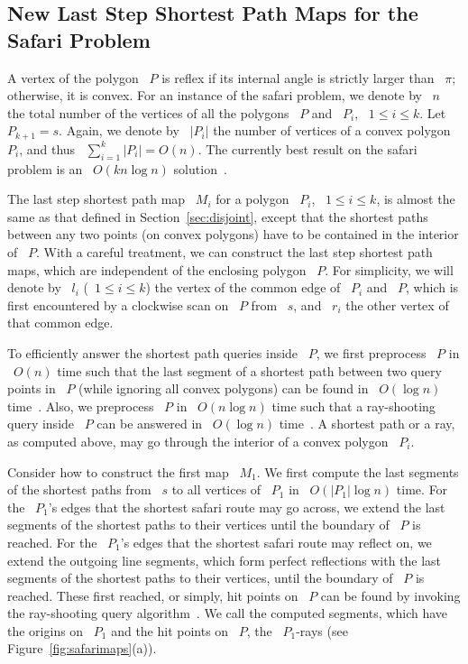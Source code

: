 \documentclass[11pt]{article}
\begin{document}
\subsection{New Last Step Shortest Path Maps for the Safari Problem}

A vertex of the polygon ~\(P\) is reflex if its internal angle is strictly larger than ~\(\pi\); otherwise, it is convex.
For an instance of the safari problem, we denote by ~\(n\) the total number of the vertices of all the polygons ~\(P\) and ~\(P_i\), ~\(1 \le i \le k\).
Let ~\(P_{k+1} = s\).
Again, we denote by ~\(|P_i|\) the number of vertices of a convex polygon ~\(P_i\), and thus ~\(\sum_{i=1}^k |P_i| = O(n)\).
The currently best result on the safari problem is an ~\(O(kn\log n)\) solution~\cite{ref6}.

The last step shortest path map ~\(M_i\) for a polygon ~\(P_i\), ~\(1 \le i \le k\), is almost the same as that defined in Section~\ref{sec:disjoint}, except that the shortest paths between any two points (on convex polygons) have to be contained in the interior of ~\(P\).
With a careful treatment, we can construct the last step shortest path maps, which are independent of the enclosing polygon ~\(P\).
For simplicity, we will denote by ~\(l_i\) (~\(1 \le i \le k\)) the vertex of the common edge of ~\(P_i\) and ~\(P\), which is first encountered by a clockwise scan on ~\(P\) from ~\(s\), and ~\(r_i\) the other vertex of that common edge.

To efficiently answer the shortest path queries inside ~\(P\), we first preprocess ~\(P\) in ~\(O(n)\) time such that the last segment of a shortest path between two query points in ~\(P\) (while ignoring all convex polygons) can be found in ~\(O(\log n)\) time~\cite{ref7}.
Also, we preprocess ~\(P\) in ~\(O(n\log n)\) time such that a ray-shooting query inside ~\(P\) can be answered in ~\(O(\log n)\) time~\cite{ref3}.
A shortest path or a ray, as computed above, may go through the interior of a convex polygon ~\(P_i\).

Consider how to construct the first map ~\(M_1\).
We first compute the last segments of the shortest paths from ~\(s\) to all vertices of ~\(P_1\) in ~\(O(|P_1|\log n)\) time.
For the ~\(P_1\)'s edges that the shortest safari route may go across, we extend the last segments of the shortest paths to their vertices until the boundary of ~\(P\) is reached.
For the ~\(P_1\)'s edges that the shortest safari route may reflect on, we extend the outgoing line segments, which form perfect reflections with the last segments of the shortest paths to their vertices, until the boundary of ~\(P\) is reached.
These first reached, or simply, hit points on ~\(P\) can be found by invoking the ray-shooting query algorithm~\cite{ref3}.
We call the computed segments, which have the origins on ~\(P_1\) and the hit points on ~\(P\), the ~\(P_1\)-rays (see Figure~\ref{fig:safarimaps}(a)).
\end{document}
